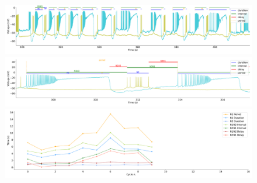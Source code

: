  	


\begin{figure}[htbp]
	\centering
	\begin{minipage}[b]{\textwidth}
		\centering
		\includegraphics[width=\textwidth,height=0.1\textheight]{./invariants/data/SUSSEX/prep4_so_no_driven/images/prep4_so_no_driven_signal_intervals_zoom.pdf}
		\includegraphics[width=\textwidth]{./invariants/data/SUSSEX/prep4_so_no_driven/images/prep4_so_no_driven_signal_intervals_cycle.pdf}
		\includegraphics[width=\textwidth]{./invariants/data/SUSSEX/prep4_so_no_driven/images/prep4_so_no_driven_time_cycle.pdf}
	\end{minipage}
	\begin{minipage}{0.9\textwidth}
		\centering
		\begin{minipage}[b]{0.45\textwidth}
			\centering

\end{minipage}
\end{minipage}
\end{figure}
